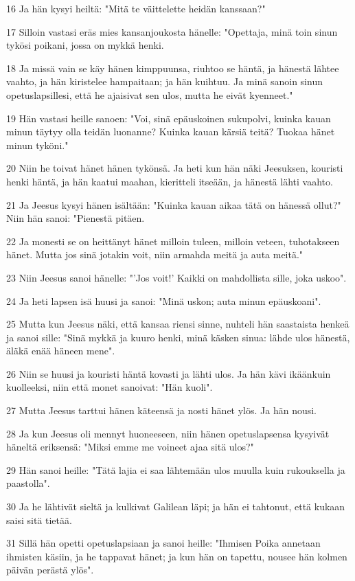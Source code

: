 \par 16 Ja hän kysyi heiltä: "Mitä te väittelette heidän kanssaan?"
\par 17 Silloin vastasi eräs mies kansanjoukosta hänelle: "Opettaja, minä toin sinun tykösi poikani, jossa on mykkä henki.
\par 18 Ja missä vain se käy hänen kimppuunsa, riuhtoo se häntä, ja hänestä lähtee vaahto, ja hän kiristelee hampaitaan; ja hän kuihtuu. Ja minä sanoin sinun opetuslapsillesi, että he ajaisivat sen ulos, mutta he eivät kyenneet."
\par 19 Hän vastasi heille sanoen: "Voi, sinä epäuskoinen sukupolvi, kuinka kauan minun täytyy olla teidän luonanne? Kuinka kauan kärsiä teitä? Tuokaa hänet minun tyköni."
\par 20 Niin he toivat hänet hänen tykönsä. Ja heti kun hän näki Jeesuksen, kouristi henki häntä, ja hän kaatui maahan, kieritteli itseään, ja hänestä lähti vaahto.
\par 21 Ja Jeesus kysyi hänen isältään: "Kuinka kauan aikaa tätä on hänessä ollut?" Niin hän sanoi: "Pienestä pitäen.
\par 22 Ja monesti se on heittänyt hänet milloin tuleen, milloin veteen, tuhotakseen hänet. Mutta jos sinä jotakin voit, niin armahda meitä ja auta meitä."
\par 23 Niin Jeesus sanoi hänelle: "'Jos voit!' Kaikki on mahdollista sille, joka uskoo".
\par 24 Ja heti lapsen isä huusi ja sanoi: "Minä uskon; auta minun epäuskoani".
\par 25 Mutta kun Jeesus näki, että kansaa riensi sinne, nuhteli hän saastaista henkeä ja sanoi sille: "Sinä mykkä ja kuuro henki, minä käsken sinua: lähde ulos hänestä, äläkä enää häneen mene".
\par 26 Niin se huusi ja kouristi häntä kovasti ja lähti ulos. Ja hän kävi ikäänkuin kuolleeksi, niin että monet sanoivat: "Hän kuoli".
\par 27 Mutta Jeesus tarttui hänen käteensä ja nosti hänet ylös. Ja hän nousi.
\par 28 Ja kun Jeesus oli mennyt huoneeseen, niin hänen opetuslapsensa kysyivät häneltä eriksensä: "Miksi emme me voineet ajaa sitä ulos?"
\par 29 Hän sanoi heille: "Tätä lajia ei saa lähtemään ulos muulla kuin rukouksella ja paastolla".
\par 30 Ja he lähtivät sieltä ja kulkivat Galilean läpi; ja hän ei tahtonut, että kukaan saisi sitä tietää.
\par 31 Sillä hän opetti opetuslapsiaan ja sanoi heille: "Ihmisen Poika annetaan ihmisten käsiin, ja he tappavat hänet; ja kun hän on tapettu, nousee hän kolmen päivän perästä ylös".
